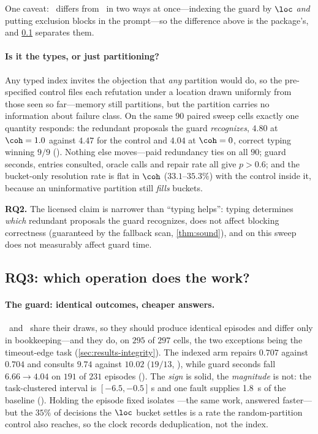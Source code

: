 One caveat: \armtyped\ differs from \armuntyped\ in two ways at once---indexing
the guard by $\loc$ \emph{and} putting exclusion blocks in the prompt---so the
difference above is the package's, and \cref{sec:results-ablation} separates
them.

\paragraph{Is it the types, or just partitioning?}
Any typed index invites the objection that \emph{any} partition would do, so
the pre-specified control files each refutation under a location drawn
uniformly from those seen so far---memory still partitions, but the partition
carries no information about failure class. On the same \num{90} paired sweep
cells exactly one quantity responds: the redundant proposals the guard
\emph{recognizes}, $4.80$ at $\coh = 1.0$ against $4.47$ for the control and
$4.04$ at $\coh = 0$, correct typing winning $9/9$ (). Nothing else
moves---paid redundancy ties on all $90$; guard seconds, entries consulted,
oracle calls and repair rate all give $p > 0.6$; and the bucket-only resolution
rate is flat in $\coh$ ($33.1$--$35.3\%$) with the control inside it, because
an uninformative partition still \emph{fills} buckets.

\textbf{RQ2.} The licensed claim is narrower than ``typing helps'': typing
determines \emph{which} redundant proposals the guard recognizes, does not
affect blocking correctness (guaranteed by the fallback scan,
\cref{thm:sound}), and on this sweep does not measurably affect guard time.

\subsection{RQ3: which operation does the work?}
\label{sec:results-ablation}

\ifsuppmatter\else\fi

\paragraph{The guard: identical outcomes, cheaper answers.}
\armguard\ and \armuntyped\ share their draws, so they should produce identical
episodes and differ only in bookkeeping---and they do, on $295$ of $297$ cells,
the two exceptions being the timeout-edge task (\cref{sec:results-integrity}).
The indexed arm repairs $0.707$ against $0.704$ and consults $9.74$ against
$10.02$ ($19/13$, ), while guard seconds fall $6.66 \to 4.04$ on
$191$ of $231$ episodes (). The \emph{sign} is solid, the
\emph{magnitude} is not: the task-clustered interval is $[-6.5, -0.5]$\,s and
one fault supplies \SI{1.8}{\second} of the baseline
(). Holding the episode fixed isolates
\Rguardcost---the same work, answered faster---but the $35\%$ of decisions the
$\loc$ bucket settles is a rate the random-partition control also reaches, so
the clock records deduplication, not the index.

